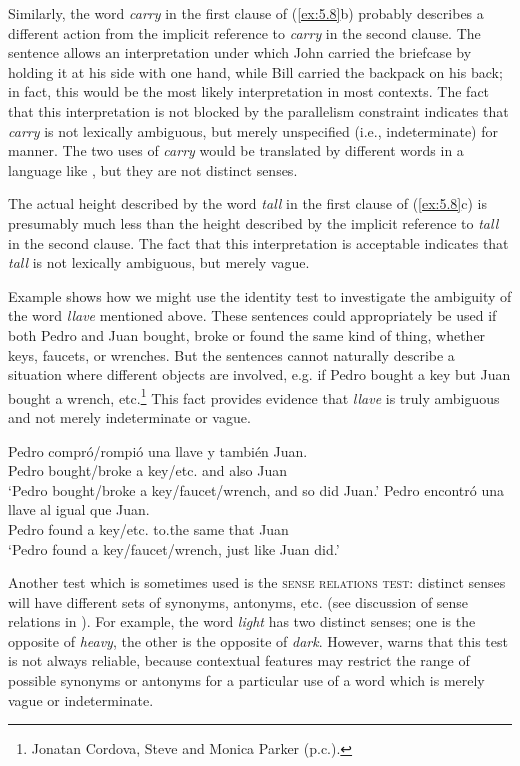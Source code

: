 Similarly, the word \textit{carry} in the first clause of (\ref{ex:5.8}b) probably describes a different action from the implicit reference to \textit{carry} in the second clause. The sentence allows an interpretation under which John carried the briefcase by holding it at his side with one hand, while Bill carried the backpack on his back; in fact, this would be the most likely interpretation in most contexts. The fact that this interpretation is not blocked by the parallelism constraint indicates that \textit{carry} is not lexically ambiguous, but merely unspecified (i.e., indeterminate) for manner. The two uses of \textit{carry} would be translated by different words in a language like , but they are not distinct senses.



The actual height described by the word \textit{tall} in the first clause of (\ref{ex:5.8}c) is presumably much less than the height described by the implicit reference to \textit{tall} in the second clause. The fact that this interpretation is acceptable indicates that \textit{tall} is not lexically ambiguous, but merely vague.



Example  shows how we might use the identity test to investigate the ambiguity of the  word \textit{llave} mentioned above. These sentences could appropriately be used if both Pedro and Juan bought, broke or found the same kind of thing, whether keys, faucets, or wrenches. But the sentences cannot naturally describe a situation where different objects are involved, e.g. if Pedro bought a key but Juan bought a wrench, etc.\footnote{Jonatan Cordova, Steve and Monica Parker (p.c.).} This fact provides evidence that \textit{llave} is truly ambiguous and not merely indeterminate or vague.


\ea \label{ex:5.9}
\ea  \gll Pedro  compró/rompió  una  llave  y  también  Juan.\\
Pedro  bought/broke  a  key/etc.  and  also  Juan\\
\glt ‘Pedro bought/broke a key/faucet/wrench, and so did Juan.’
\ex \gll  Pedro  encontró  una  llave  al  igual  que  Juan.\\
Pedro  found  a  key/etc.  to.the  same  that  Juan\\
\glt ‘Pedro found a key/faucet/wrench, just like Juan did.’
\z \z


Another test which is sometimes used is the \textsc{sense relations test}: distinct senses will have different sets of synonyms, antonyms, etc. (see discussion of sense relations in ). For example, the word \textit{light} has two distinct senses; one is the opposite of \textit{heavy}, the other is the opposite of \textit{dark}. However, \citet[56--57]{Cruse1986} warns that this test is not always reliable, because contextual features may restrict the range of possible synonyms or antonyms for a particular use of a word which is merely vague or indeterminate.




